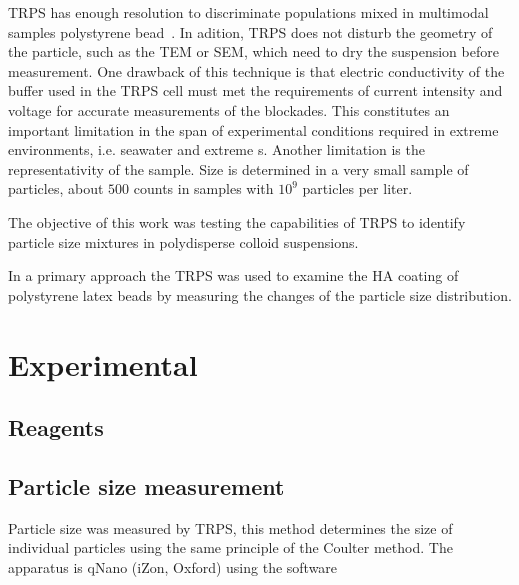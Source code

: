 \documentclass[journal=langd5,manuscript=article]{achemso}
\begin{document}
TRPS has enough resolution to discriminate populations mixed in multimodal
samples polystyrene bead~\cite{Varenne2016MultimodalMethods}. 
In adition, TRPS does not disturb the geometry of the particle, such as  the
TEM or SEM, which need to dry the suspension before measurement.
One drawback of this technique is that electric conductivity of the buffer
used in the TRPS cell must met the requirements of current intensity and
voltage for accurate measurements of the blockades. This constitutes an
important limitation in the span of  experimental conditions  required in
extreme environments, i.e. seawater and extreme s.
%
Another limitation is the representativity of the sample. Size is determined in a very small sample of particles, about  $500$ counts in samples with $10^9$ particles per liter.

The objective of this work was testing the capabilities of TRPS to identify
particle size mixtures in  polydisperse colloid suspensions.

In a primary approach the TRPS was used to examine the HA coating of
polystyrene latex beads by measuring the changes of the particle size
distribution. 



\section{Experimental} %


\subsection{Reagents}




\subsection{Particle size measurement}
Particle size was measured by 
TRPS, this method determines the size of individual particles using the same principle of the Coulter method.
The apparatus is qNano (iZon, Oxford) using the software
\end{document}

